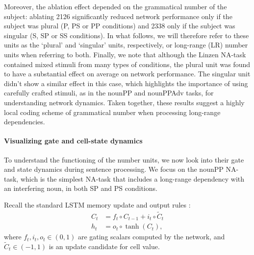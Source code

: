 Moreover, the ablation effect depended on the grammatical number of the subject: ablating \unit{2}{126} significantly reduced
network performance only if the subject was plural (P, PS or PP conditions) and \unit{2}{338}
only if the subject was singular (S, SP or SS conditions). In what follows, we will therefore
refer to these units as the `plural' and `singular' units, respectively,
or long-range (LR) number units when referring to both. Finally, we note that although the Linzen NA-task contained mixed stimuli from many types of conditions, the plural unit was found to have a substantial effect on average on network performance. The singular unit didn't show a similar effect in this case, which highlights the importance of using carefully crafted stimuli, as in the nounPP and nounPPAdv tasks, for understanding network dynamics. Taken
together, these results suggest a highly local coding scheme of
grammatical number when processing long-range dependencies.

\paragraph{Visualizing gate and cell-state dynamics}\label{subsec:gate-dynamics}
To understand the functioning of the number units, we now look
into their gate and state dynamics during sentence processing. We
focus on the nounPP NA-task, which is the simplest NA-task that includes a
long-range dependency with an interfering noun, in both SP and PS
conditions.

Recall the standard LSTM memory update and output rules \cite{Hochreiter:Schmidhuber:1997}:
\begin{align} 
    C_t &= f_t\circ C_{t-1} + i_t\circ \widetilde{C}_t \label{eq:update-rule} \\
     h_t &= o_t\circ \tanh(C_t) \label{eq:output},
\end{align}
where $f_t, i_t, o_t \in (0,1)$ are gating scalars computed by the network, and $\widetilde{C}_t \in (-1, 1)$ is an update candidate for cell value.


